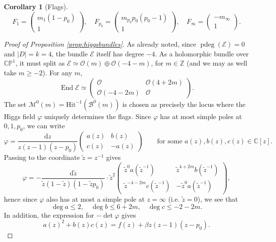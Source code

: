 \documentclass[12pt,letterpaper,reqno]{amsart}
\def\mathbf#1{#1}%
\newtheorem{cor}[thm]{Corollary}
\theoremstyle{remark}
\theoremstyle{definition}
\numberwithin{thm}{section}
\numberwithin{equation}{section}
\numberwithin{figure}{section}
\newcommand{\cM}{\ensuremath{\mathcal M}}
\newcommand{\cO}{\ensuremath{\mathcal O}}
\newcommand{\C}{\ensuremath{\mathbb C}}
\newcommand{\CP}{\ensuremath{\mathbb {CP}}}
\newcommand{\Z}{\ensuremath{\mathbb Z}}
\newcommand{\cE}{{\mathcal E}}
\newcommand{\de}{\mathrm{d}}
\DeclareMathOperator{\End}{End}
\DeclareMathOperator{\pdeg}{pdeg}
\begin{document}
\begin{cor} [Flags]
\begin{equation*}
      F_1 = 
  \begin{pmatrix} m_1(1-p_0)  \\ 1 \end{pmatrix}, \quad 
        F_{p_0} = \begin{pmatrix} m_{p_0} p_0(p_0-1) \\ 1 \end{pmatrix}, \quad 
          F_\infty = \begin{pmatrix} - m_\infty\\ 1 \end{pmatrix}.
   \end{equation*}
\end{cor}

\begin{proof}[Proof of Proposition \ref{prop:higgsbundles}]
As already noted, since $\pdeg(\cE)=0$ and $|D| = k = 4$, the bundle $\cE$ itself has degree $-4$.  As a holomorphic bundle over $\CP^1$, it must
split as $\cE \simeq \cO(m) \oplus \cO(-4-m)$, for $m \in \Z$ (and we may as well take $m\geq -2$). For any $m$,
\begin{equation}
\End \cE \simeq \begin{pmatrix} \cO & \cO(4+2m) \\ \cO(-4-2m) & \cO \end{pmatrix}.
\end{equation}
The set $\cM^0(\mathbf{m})=\mathrm{Hit}^{-1}(\mathcal{B}^0(\mathbf{m}))$ is chosen as precisely the locus where the Higgs field $\varphi$ uniquely determines the flags. 
Since $\varphi$ has at most simple poles at $0, 1, p_0$, we can write
 \begin{equation}
  \varphi = \frac{\de z}{z(z-1)(z-p_0)}\begin{pmatrix} a(z) & b(z) \\ c(z) & -a(z) \end{pmatrix} \qquad \mbox{for some } a(z), b(z), c(z) \in \C[z].
\label{genvarphi}
 \end{equation}
Passing to the coordinate $\tilde{z}=z^{-1}$ gives
\begin{equation}
\varphi = -\frac{\de \tilde{z}}{\tilde{z}(1-\tilde{z})(1-\tilde{z}p_0)} \cdot \tilde{z}^2 \begin{pmatrix} \tilde{z}^0 a(\tilde{z}^{-1}) & 
\tilde{z}^{4+2m} b(\tilde{z}^{-1}) \\ \tilde{z}^{-4-2m} c(\tilde{z}^{-1}) & -\tilde{z}^0 a(\tilde{z}^{-1}) \end{pmatrix},
\end{equation}
hence since $\varphi$ also has at most a simple pole at $z=\infty$ (i.e. $\tilde{z}=0$), we see that
\begin{equation}
 \deg a \leq 2, \quad  \deg b \leq 6+2m, \quad \deg c \leq -2-2m.
\end{equation}
In addition, the expression for $-\det \varphi$ gives
\begin{equation} \label{eq:determinant}
a(z)^2 + b(z) c(z) = f(z)+\beta z(z-1)(z-p_0).
\end{equation}


\end{proof}
\end{document}
